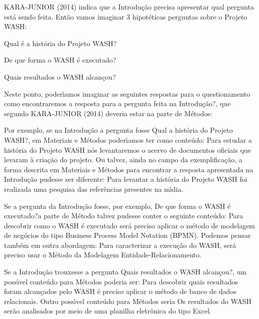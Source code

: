 \documentclass[
12pt,		%
openright,	%
twoside,  %
a4paper,			%
chapter=TITLE,		%
english,			%
french,				%
spanish,			%
brazil				%
]{USPSC-classe/USPSC}
\begin{document}
 KARA-JUNIOR (2014) indica que a Introdu\c{c}\~ao precisa apresentar qual pergunta est\'a sendo feita. Ent\~ao vamos imaginar 3 hipot\'eticas perguntas sobre o Projeto WASH:











\begin{alineas}
\item \textquotedbl Qual \'e a hist\'oria do Projeto WASH?\textquotedbl 
\item \textquotedbl De que forma o WASH \'e executado?\textquotedbl 
\item \textquotedbl Quais resultados o WASH alcan\c{c}ou?\textquotedbl 
\end{alineas}

Neste ponto, poder\'{\i}amos imaginar as seguintes respostas para o questionamento \textquotedbl como encontraremos a resposta para a pergunta feita na Introdu\c{c}\~ao?\textquotedbl , que segundo KARA-JUNIOR (2014) deveria estar na parte de M\'etodos:











\begin{alineas}
\item Por exemplo, se na Introdu\c{c}\~ao a pergunta fosse \textquotedbl Qual a hist\'oria do Projeto WASH?\textquotedbl , em Materiais e M\'etodos poder\'{\i}amos ter como  conte\'udo: \textquotedbl Para estudar a hist\'oria do Projeto WASH n\'os levantaremos o acervo de documentos oficiais que levaram \`a cria\c{c}\~ao do projeto\textquotedbl . Ou talvez, ainda no campo da exemplifica\c{c}\~ao, a forma descrita em Materiais e M\'etodos para  encontrar a resposta apresentada na Introdu\c{c}\~ao pudesse ser diferente: \textquotedbl Para levantar a hist\'oria do Projeto WASH foi realizada uma pesquisa das refer\^encias presentes na m\'{\i}dia\textquotedbl .
\item Se a pergunta da Introdu\c{c}\~ao fosse, por exemplo, \textquotedbl De que forma o WASH \'e executado?\textquotedbl  a parte de M\'etodo talvez pudesse conter o seguinte conte\'udo: \textquotedbl Para descobrir como o WASH \'e executado ser\'a preciso aplicar o m\'etodo de modelagem de neg\'ocios do tipo Business Process Model Notation (BPMN)\textquotedbl . Podemos pensar tamb\'em em outra abordagem: \textquotedbl Para caracterizar a execu\c{c}\~ao do WASH, ser\'a preciso usar o M\'etodo da Modelagem Entidade-Relacionamento\textquotedbl .
\item Se a Introdu\c{c}\~ao trouxesse a pergunta \textquotedbl Quais resultados o WASH alcan\c{c}ou?\textquotedbl , um poss\'{\i}vel conte\'udo para M\'etodos poderia ser: \textquotedbl Para descobrir quais resultados foram alcan\c{c}ados pelo WASH \'e preciso aplicar o m\'etodo de banco de dados relacionais\textquotedbl . Outro poss\'{\i}vel conte\'udo para M\'etodos seria \textquotedbl Os resultados do WASH ser\~ao analisados por meio de uma planilha eletr\^onica do tipo Excel\textquotedbl .
\end{alineas}
\end{document}
